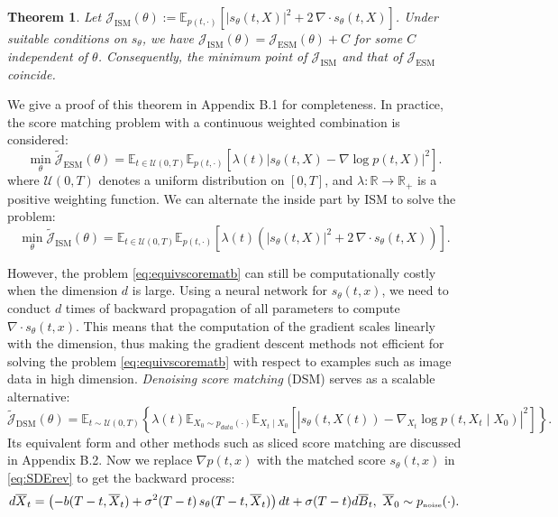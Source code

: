 \documentclass[letterpaper,11pt,reqno]{amsart}
\newcommand{\blue}[1]{\textcolor{blue}{#1}}
\newtheorem{theorem}{Theorem}[section]
\numberwithin{equation}{section}
\begin{document}
\begin{theorem}
\label{thm:scoremat}
Let 
$\mathcal{J}_{\text{ISM}}(\theta):= \mathbb{E}_{p(t, \cdot)} \left[ |s_\theta(t,X)|^2  + 2 \, \nabla \cdot s_\theta (t,X)\right]$.
Under suitable conditions on $s_\theta$, we have 
$\mathcal{J}_{\text{ISM}}(\theta) = \mathcal{J}_{\text{ESM}}(\theta) + C$ for some $C$ independent of $\theta$. 
Consequently, the minimum point of $\mathcal{J}_{\text{ISM}}$ and that of $\mathcal{J}_{\text{ESM}}$ coincide. 
\end{theorem}

\quad We give a proof of this theorem in Appendix B.1 for completeness.
In practice, the score matching problem with a continuous weighted combination is considered:
\begin{equation}
\label{eq:weighted score matching}
\min_\theta \tilde{\mathcal{J}}_{\text{ESM}}(\theta) = \mathbb{E}_{t \in \mathcal{U}(0, T)}\mathbb{E}_{p(t, \cdot)} \left[\lambda(t)|s_\theta(t,X) - \nabla \log p(t,X)|^2\right].
\end{equation}
where $\mathcal{U}(0, T)$ denotes a uniform distribution on $[0, T]$, and $\lambda: \mathbb{R} \rightarrow \mathbb{R}_{+}$ is a positive weighting function. 
We can alternate the inside part by ISM to solve the problem:
\begin{equation}
\label{eq:equivscorematb}
\min_\theta \widetilde{\mathcal{J}}_{\text{ISM}}(\theta) = \mathbb{E}_{t \in \mathcal{U}(0, T)}\mathbb{E}_{p(t, \cdot)} \left[\lambda(t)\left(|s_\theta(t,X)|^2  + 2 \, \nabla \cdot s_\theta (t,X)\right)\right].
\end{equation}

However, the problem \eqref{eq:equivscorematb} can still be computationally costly when the dimension $d$ is large. 
Using a neural network for $s_{\theta}(t,x)$, 
we need to conduct $d$ times of backward propagation of all parameters to compute $\nabla\cdot s_{\theta}(t,x)$. 
This means that the computation of the gradient scales linearly with the dimension, 
thus making the gradient descent methods not efficient for solving the problem \eqref{eq:equivscorematb}
with respect to examples such as image data in high dimension. {\em Denoising score matching} (DSM) \cite{Vi11}
serves as a scalable alternative:
$$
\tilde{\mathcal{J}}_{\text{DSM}}(\theta)=\mathbb{E}_{t\sim\mathcal{U}(0, T)}\left\{\lambda(t) \mathbb{E}_{X_0\sim p_{data}(\cdot)} \mathbb{E}_{X_t \mid X_0}\left[\left|s_{\theta}(t,X(t))-\nabla_{X_t} \log p(t,X_t \mid X_0)\right|^2\right]\right\}.
$$
Its equivalent form
and other methods such as sliced score matching \cite{Song20sl}
are discussed in Appendix B.2.
Now we replace $\nabla p(t,x)$ with the matched score $s_\theta(t,x)$ in \eqref{eq:SDErev} 
to get the backward process:
\begin{equation}
\label{eq:SDErevc}
d\overline{X}_t = \left(-b(T-t, \overline{X}_t) + \sigma^2(T-t) \, s_\theta(T-t, \overline{X}_t) \right)dt + \sigma(T-t) d\overline{B}_t,
\,\, \overline{X}_0 \sim p_{\tiny \mbox{noise}}(\cdot).
\end{equation}
\end{document}
